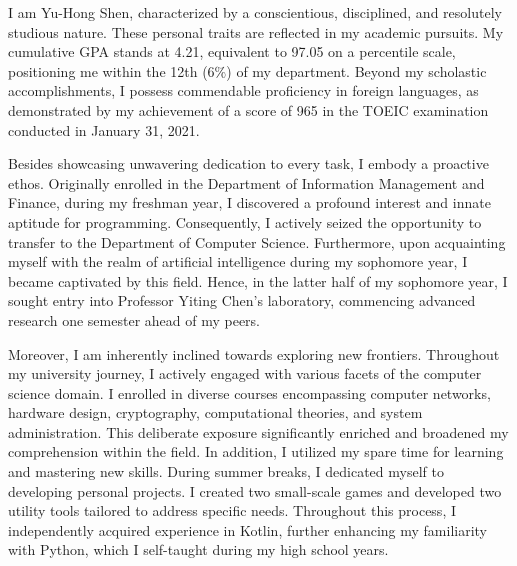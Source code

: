 



\begin{cvletter}
\text{\\ \\ \\}
\newline
\newline
\newline
{}
I am Yu-Hong Shen, characterized by a conscientious, disciplined, and resolutely studious nature. These personal traits are reflected in my academic pursuits. My cumulative GPA stands at 4.21, equivalent to 97.05 on a percentile scale, positioning me within the 12th (6$\%$) of my department. Beyond my scholastic accomplishments, I possess commendable proficiency in foreign languages, as demonstrated by my achievement of a score of 965 in the TOEIC examination conducted in January 31, 2021.

Besides showcasing unwavering dedication to every task, I embody a proactive ethos. Originally enrolled in the Department of Information Management and Finance, during my freshman year, I discovered a profound interest and innate aptitude for programming. Consequently, I actively seized the opportunity to transfer to the Department of Computer Science. Furthermore, upon acquainting myself with the realm of artificial intelligence during my sophomore year, I became captivated by this field. Hence, in the latter half of my sophomore year, I sought entry into Professor Yiting Chen's laboratory, commencing advanced research one semester ahead of my peers.

Moreover, I am inherently inclined towards exploring new frontiers. Throughout my university journey, I actively engaged with various facets of the computer science domain. I enrolled in diverse courses encompassing computer networks, hardware design, cryptography, computational theories, and system administration. This deliberate exposure significantly enriched and broadened my comprehension within the field. In addition, I utilized my spare time for learning and mastering new skills. During summer breaks, I dedicated myself to developing personal projects. I created two small-scale games and developed two utility tools tailored to address specific needs. Throughout this process, I independently acquired experience in Kotlin, further enhancing my familiarity with Python, which I self-taught during my high school years.


\end{cvletter}
